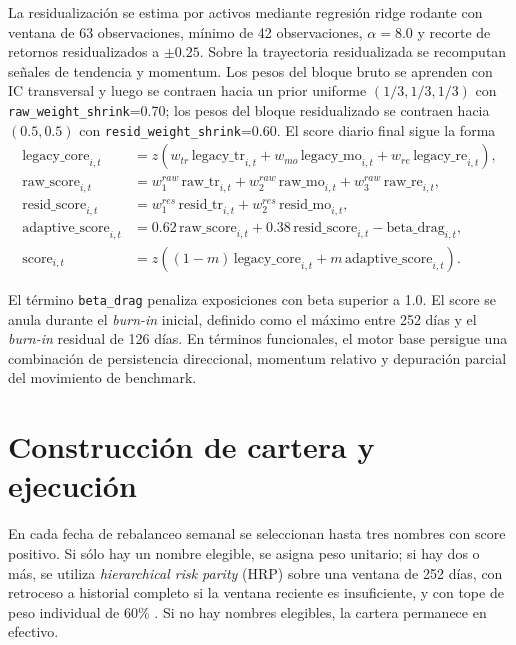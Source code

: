 \documentclass[11pt]{article}
\begin{document}
La residualizaci\'on se estima por activos mediante regresi\'on ridge rodante con ventana de 63 observaciones, m\'inimo de 42 observaciones, $\alpha=8.0$ y recorte de retornos residualizados a $\pm 0.25$. Sobre la trayectoria residualizada se recomputan se\~nales de tendencia y momentum. Los pesos del bloque bruto se aprenden con IC transversal y luego se contraen hacia un prior uniforme $(1/3,1/3,1/3)$ con \texttt{raw\_weight\_shrink}=0.70; los pesos del bloque residualizado se contraen hacia $(0.5,0.5)$ con \texttt{resid\_weight\_shrink}=0.60. El score diario final sigue la forma
\begin{align}
\text{legacy\_core}_{i,t} &= z\!\left(w_{tr}\,\text{legacy\_tr}_{i,t} + w_{mo}\,\text{legacy\_mo}_{i,t} + w_{re}\,\text{legacy\_re}_{i,t}\right), \\
\text{raw\_score}_{i,t} &= w^{raw}_1 \,\text{raw\_tr}_{i,t} + w^{raw}_2 \,\text{raw\_mo}_{i,t} + w^{raw}_3 \,\text{raw\_re}_{i,t}, \\
\text{resid\_score}_{i,t} &= w^{res}_1 \,\text{resid\_tr}_{i,t} + w^{res}_2 \,\text{resid\_mo}_{i,t}, \\
\text{adaptive\_score}_{i,t} &= 0.62\,\text{raw\_score}_{i,t} + 0.38\,\text{resid\_score}_{i,t} - \text{beta\_drag}_{i,t}, \\
\text{score}_{i,t} &= z\!\left((1-m)\,\text{legacy\_core}_{i,t} + m\,\text{adaptive\_score}_{i,t}\right).
\end{align}

El t\'ermino \texttt{beta\_drag} penaliza exposiciones con beta superior a 1.0. El score se anula durante el \textit{burn-in} inicial, definido como el m\'aximo entre 252 d\'ias y el \textit{burn-in} residual de 126 d\'ias. En t\'erminos funcionales, el motor base persigue una combinaci\'on de persistencia direccional, momentum relativo y depuraci\'on parcial del movimiento de benchmark.

\section{Construcci\'on de cartera y ejecuci\'on}
En cada fecha de rebalanceo semanal se seleccionan hasta tres nombres con score positivo. Si s\'olo hay un nombre elegible, se asigna peso unitario; si hay dos o m\'as, se utiliza \textit{hierarchical risk parity} (HRP) sobre una ventana de 252 d\'ias, con retroceso a historial completo si la ventana reciente es insuficiente, y con tope de peso individual de 60\% \cite{LopezdePrado2016}. Si no hay nombres elegibles, la cartera permanece en efectivo.
\end{document}
